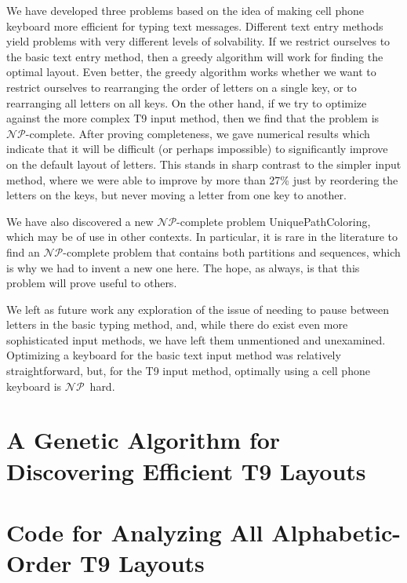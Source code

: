 \documentclass[runningheads]{llncs}
\newcommand{\NP}{\ensuremath{\mathcal{NP}}}
\begin{document}
We have developed three problems based on the idea of making cell phone keyboard more efficient for typing text messages.  Different text entry methods yield problems with very different levels of solvability.  If we restrict ourselves to the basic text entry method, then a greedy algorithm will work for finding the optimal layout.  Even better, the greedy algorithm works whether we want to restrict ourselves to rearranging the order of letters on a single key, or to rearranging all letters on all keys.  On the other hand, if we try to optimize against the more complex T9 input method, then we find that the problem is \NP-complete.  After proving completeness, we gave numerical results which indicate that it will be difficult (or perhaps impossible) to significantly improve on the default layout of letters.  This stands in sharp contrast to the simpler input method, where we were able to improve by more than 27\% just by reordering the letters on the keys, but never moving a letter from one key to another.

We have also discovered a new \NP-complete problem {\sc UniquePathColoring}, which may be of use in other contexts.  In particular, it is rare in the literature to find an \NP-complete problem that contains both partitions and sequences, which is why we had to invent a new one here.  The hope, as always, is that this problem will prove useful to others.

We left as future work any exploration of the issue of needing to pause between
letters in the basic typing method, and, while there do exist even more
sophisticated input methods\cite{hcimethods}, we have left them unmentioned and unexamined.  Optimizing a keyboard for the basic text input method was relatively straightforward, but, for the T9 input method, optimally using a cell phone keyboard is \NP\ hard.




\newpage
\appendix
\section{A Genetic Algorithm for Discovering Efficient T9 Layouts}
{\tiny

}

\section{Code for Analyzing All Alphabetic-Order T9 Layouts}
{\tiny

}
\end{document}
